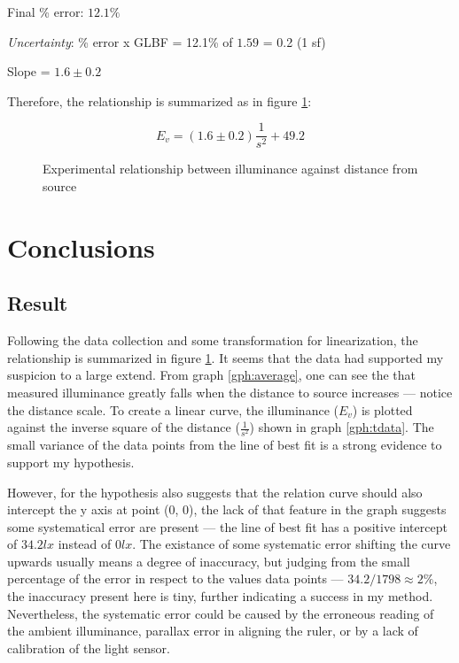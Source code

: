\documentclass[a4paper,12pt]{article}
\begin{document}
Final \% error: $12.1\%$

\textit{Uncertainty}: \% error x GLBF = 12.1\% of $1.59$ = 0.2 (1 sf)

Slope = $1.6 \pm 0.2$

Therefore, the relationship is summarized as in figure \ref{fig:rel}:
\begin{figure}[h!]
    \[
       E_v = (1.6 \pm 0.2) \frac{1}{s^2} + 49.2
    \]
    \caption{Experimental relationship between illuminance against distance from source}
    \label{fig:rel}
\end{figure}

\section{Conclusions}
\subsection{Result}

Following the data collection and some transformation for linearization, the relationship is summarized in figure \ref{fig:rel}. It seems that the data had supported my suspicion to a large extend. From graph \ref{gph:average}, one can see the that measured illuminance  greatly falls when the distance to source increases --- notice the distance scale. To create a linear curve, the illuminance ($E_v$) is plotted against the inverse square of the distance ($\frac{1}{s^2}$) shown in graph \ref{gph:tdata}. The small variance of the data points from the line of best fit is a strong evidence to support my hypothesis.

However, for the hypothesis also suggests that the relation curve should also intercept the y axis at point (0, 0), the lack of that feature in the graph suggests some systematical error are present --- the line of best fit has a positive intercept of $34.2 \si{lx}$ instead of $0 \si{lx}$. The existance of some systematic error shifting the curve upwards usually means a degree of inaccuracy, but judging from the small percentage of the error in respect to the values data points --- $34.2 / 1798 \approx 2\%$, the inaccuracy present here is tiny, further indicating a success in my method. Nevertheless, the systematic error could be caused by the erroneous reading of the ambient illuminance, parallax error in aligning the ruler, or by a lack of calibration of the light sensor.
\end{document}
